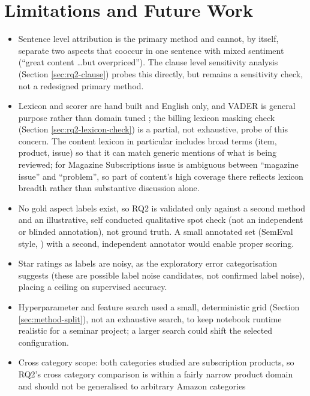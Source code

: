 \documentclass[11pt,a4paper,DIV=12]{scrartcl}
\begin{document}
\section{Limitations and Future Work}
\label{sec:limitations}

\begin{itemize}[leftmargin=1.4em]
  \item Sentence level attribution is the primary method and cannot,
  by itself, separate two aspects that cooccur in one sentence with mixed
  sentiment (``great content \dots but overpriced''). The clause level
  sensitivity analysis (Section \ref{sec:rq2-clause}) probes this directly,
  but remains a sensitivity check, not a redesigned primary method.
  \item Lexicon and scorer are hand built and English only, and VADER is
  general purpose rather than domain tuned \citep{taboada2011lexicon}; the
  billing lexicon masking check (Section \ref{sec:rq2-lexicon-check}) is a
  partial, not exhaustive, probe of this concern. The content lexicon
  in particular includes broad terms (item, product, issue) so that it
  can match generic mentions of what is being reviewed; for Magazine
  Subscriptions issue is ambiguous between ``magazine issue'' and
  ``problem'', so part of content's high coverage there reflects lexicon
  breadth rather than substantive discussion alone.
  \item No gold aspect labels exist, so RQ2 is validated only against a
  second method and an illustrative, self conducted qualitative
  spot check (not an independent or blinded annotation), not ground truth. A
  small annotated set (SemEval style, \citealp{pontiki2014semeval}) with a
  second, independent annotator would enable proper scoring.
  \item Star ratings as labels are noisy, as the exploratory error
  categorisation suggests (these are possible label noise candidates, not
  confirmed label noise), placing a ceiling on supervised accuracy.
  \item Hyperparameter and feature search used a small, deterministic
  grid (Section \ref{sec:method-split}), not an exhaustive search, to keep
  notebook runtime realistic for a seminar project; a larger search could shift
  the selected configuration.
  \item Cross category scope: both categories studied are subscription
  products, so RQ2's cross category comparison is within a fairly narrow
  product domain and should not be generalised to arbitrary Amazon categories

\end{itemize}
\end{document}
